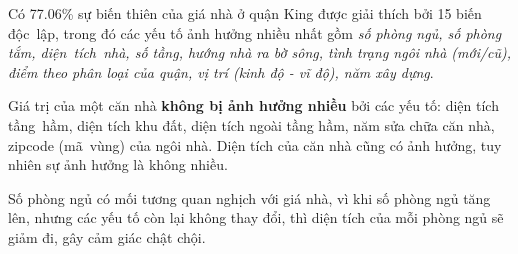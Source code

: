 Có 77.06\% sự biến thiên của giá nhà ở quận King được giải thích bởi 15 biến độc~lập, trong đó các yếu tố ảnh hưởng nhiều nhất gồm \textit{số phòng ngủ, số phòng tắm, diện~tích~nhà, số tầng, hướng nhà ra bờ sông, tình trạng ngôi nhà (mới/cũ), điểm theo phân loại của quận, vị trí (kinh độ - vĩ độ), năm xây dựng}.

Giá trị của một căn nhà \textbf{không bị ảnh hưởng nhiều} bởi các yếu tố: diện tích tầng~hầm, diện tích khu đất, diện tích ngoài tầng hầm, năm sửa chữa căn nhà, zipcode (mã~vùng) của ngôi nhà. Diện tích của căn nhà cũng có ảnh hưởng, tuy nhiên sự ảnh hưởng là không nhiều.

Số phòng ngủ có mối tương quan nghịch với giá nhà, vì khi số phòng ngủ tăng lên, nhưng các yếu tố còn lại không thay đổi, thì diện tích của mỗi phòng ngủ sẽ giảm đi, gây cảm giác chật chội. 

